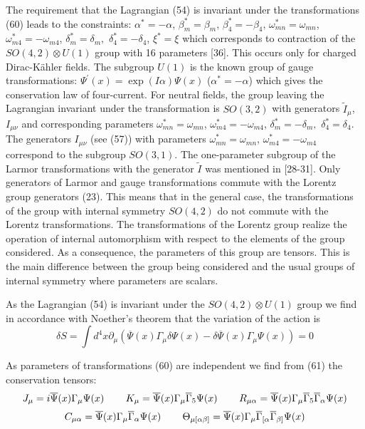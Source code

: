 \documentclass[a4paper,12pt]{article}
\begin{document}
The requirement that the Lagrangian (54) is invariant under the
transformations (60) leads to the constraints: $\alpha
^{*}=-\alpha $, $ \beta _m^{*}=\beta _m$, $\beta _4^{*}=-\beta
_4$, $\omega _{mn}^{*}=\omega _{mn}$, $\omega _{m4}^{*}=-\omega
_{m4}$, $\delta _m^{*}=\delta _m,$ $\delta _4^{*}=-\delta _4$,
$\xi ^{*}=\xi $ which corresponds to contraction of the $
SO(4,2)\otimes U(1)$ group with 16 parameters [36]. This occurs
only for charged Dirac-K\"ahler fields. The subgroup $U(1)$ is the
known group of gauge transformations: $\Psi ^{\prime }(x)=\exp
\left( I\alpha \right) \Psi (x)$ ($\alpha ^{*}=-\alpha $) which
gives the conservation law of four-current. For neutral fields,
the group leaving the Lagrangian invariant under the
transformation is $SO(3,2)$ with generators $\widetilde{I}_\mu $,
$ I_{\mu \nu }$ and corresponding parameters $\omega
_{mn}^{*}=\omega _{mn}$, $ \omega _{m4}^{*}=-\omega _{m4}$,
$\delta _m^{*}=-\delta _m,$ $\delta _4^{*}=\delta _4$. The
generators $I_{\mu \nu }$ (see (57)) with parameters $ \omega
_{mn}^{*}=\omega _{mn}$, $\omega _{m4}^{*}=-\omega _{m4}$
correspond to the subgroup $SO(3,1)$. The one-parameter subgroup
of the Larmor transformations with the generator $\widetilde{I}$
was mentioned in [28-31]. Only generators of Larmor and gauge
transformations commute with the Lorentz group generators (23).
This means that in the general case, the transformations of the
group with internal symmetry $SO(4,2)$ do not commute with the
Lorentz transformations. The transformations of the Lorentz group
realize the operation of internal automorphism with respect to the
elements of the group considered. As a consequence, the parameters
of this group are tensors. This is the main difference between the
group being considered and the usual groups of internal symmetry
where parameters are scalars.

As the Lagrangian (54) is invariant under the $SO(4,2)\otimes U(1)$ group we
find in accordance with Noether's theorem that the variation of the action
is
\begin{equation}
\delta S=\int d^4x\partial _\mu \left( \overline{\Psi }(x)\Gamma _\mu \delta
\Psi (x)-\delta \overline{\Psi }(x)\Gamma _\mu \Psi (x)\right) =0  \label{61}
\end{equation}

As parameters of transformations (60) are independent we find from (61) the
conservation tensors:
\[
J_\mu =i\overline{\Psi }(x)\Gamma _\mu \Psi (x)\hspace{0.3in}K_\mu
= \overline{\Psi }(x)\Gamma _\mu \overline{\Gamma }_5\Psi
(x)\hspace{0.3in} R_{\mu \alpha }=\overline{\Psi }(x)\Gamma _\mu
\overline{\Gamma }_5\overline{ \Gamma }_\alpha \Psi (x)
\]
\begin{equation}
C_{\mu \alpha }=\overline{\Psi }(x)\Gamma _\mu \overline{\Gamma
}_\alpha \Psi (x)\hspace{0.3in}\Theta _{\mu [\alpha \beta
]}=\overline{\Psi } (x)\Gamma _\mu \overline{\Gamma }_{[\alpha
}\overline{\Gamma }_{\beta ]}\Psi (x)  \label{62}
\end{equation}
\end{document}
